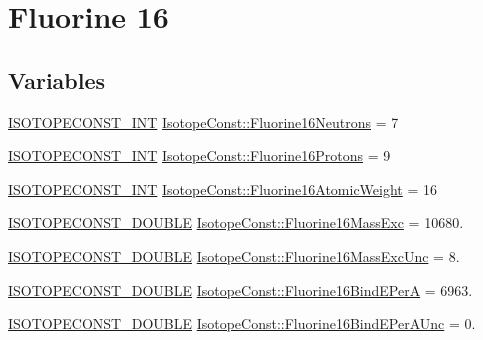 \hypertarget{group___isotope_const-_fluorine-_f16}{}\section{Fluorine 16}
\label{group___isotope_const-_fluorine-_f16}
\subsection*{Variables}
\begin{DoxyCompactItemize}
\item 
\mbox{\hyperlink{group___isotope_const-_macros_ga5f18360b3e99483a35c32d789e62621c}{I\+S\+O\+T\+O\+P\+E\+C\+O\+N\+S\+T\+\_\+\+I\+NT}} \mbox{\hyperlink{group___isotope_const-_fluorine-_f16_ga031c2c2c97801d5398bf8ad81e678dac}{Isotope\+Const\+::\+Fluorine16\+Neutrons}} = 7
\item 
\mbox{\hyperlink{group___isotope_const-_macros_ga5f18360b3e99483a35c32d789e62621c}{I\+S\+O\+T\+O\+P\+E\+C\+O\+N\+S\+T\+\_\+\+I\+NT}} \mbox{\hyperlink{group___isotope_const-_fluorine-_f16_ga5f7e20f61c3119018cdecf64f132d002}{Isotope\+Const\+::\+Fluorine16\+Protons}} = 9
\item 
\mbox{\hyperlink{group___isotope_const-_macros_ga5f18360b3e99483a35c32d789e62621c}{I\+S\+O\+T\+O\+P\+E\+C\+O\+N\+S\+T\+\_\+\+I\+NT}} \mbox{\hyperlink{group___isotope_const-_fluorine-_f16_gab6422480f14d5a07e3aab61351e903d0}{Isotope\+Const\+::\+Fluorine16\+Atomic\+Weight}} = 16
\item 
\mbox{\hyperlink{group___isotope_const-_macros_ga8f45a7272ce02c0b4c65c44636ed719a}{I\+S\+O\+T\+O\+P\+E\+C\+O\+N\+S\+T\+\_\+\+D\+O\+U\+B\+LE}} \mbox{\hyperlink{group___isotope_const-_fluorine-_f16_ga67073a77a47e06926b4980cd7f4dee1d}{Isotope\+Const\+::\+Fluorine16\+Mass\+Exc}} = 10680.
\item 
\mbox{\hyperlink{group___isotope_const-_macros_ga8f45a7272ce02c0b4c65c44636ed719a}{I\+S\+O\+T\+O\+P\+E\+C\+O\+N\+S\+T\+\_\+\+D\+O\+U\+B\+LE}} \mbox{\hyperlink{group___isotope_const-_fluorine-_f16_ga376ba3bd52de78d25716b9a1053fd64b}{Isotope\+Const\+::\+Fluorine16\+Mass\+Exc\+Unc}} = 8.
\item 
\mbox{\hyperlink{group___isotope_const-_macros_ga8f45a7272ce02c0b4c65c44636ed719a}{I\+S\+O\+T\+O\+P\+E\+C\+O\+N\+S\+T\+\_\+\+D\+O\+U\+B\+LE}} \mbox{\hyperlink{group___isotope_const-_fluorine-_f16_gab87082a2d0c771ad0f7c7b3c7a2a0fd6}{Isotope\+Const\+::\+Fluorine16\+Bind\+E\+PerA}} = 6963.
\item 
\mbox{\hyperlink{group___isotope_const-_macros_ga8f45a7272ce02c0b4c65c44636ed719a}{I\+S\+O\+T\+O\+P\+E\+C\+O\+N\+S\+T\+\_\+\+D\+O\+U\+B\+LE}} \mbox{\hyperlink{group___isotope_const-_fluorine-_f16_ga57e9ba5efaa59adf66b762308fa6ff36}{Isotope\+Const\+::\+Fluorine16\+Bind\+E\+Per\+A\+Unc}} = 0.

\end{DoxyCompactItemize}
